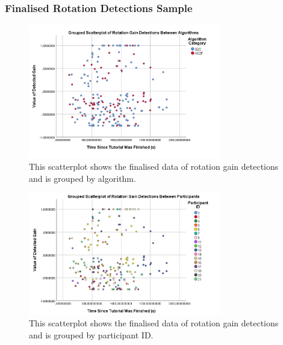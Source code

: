 \subsubsection{Finalised Rotation Detections Sample}
\begin{figure}[tbph]
    \centering
    \includegraphics[width=0.75\textwidth]{figures/graphs/ProcessedRotationDetections.png}
    \caption[Finalised Detection Scatterplot For Rotation Gains, Grouped by Algorithm]{This scatterplot shows the finalised data of rotation gain detections and is grouped by algorithm.}
    \label{fig:rotationDetectionDataByAlgorithm}
\end{figure}

\begin{figure}[tbph]
    \centering
    \includegraphics[width=0.75\textwidth]{figures/graphs/ProcessedRotationDetectionsByParticipant.png}
    \caption[Finalised Detection Scatterplot For Rotation Gains, Grouped by Participant ID]{This scatterplot shows the finalised data of rotation gain detections and is grouped by participant ID.}
    \label{fig:rotationDetectionDataByParticipant}
\end{figure}

